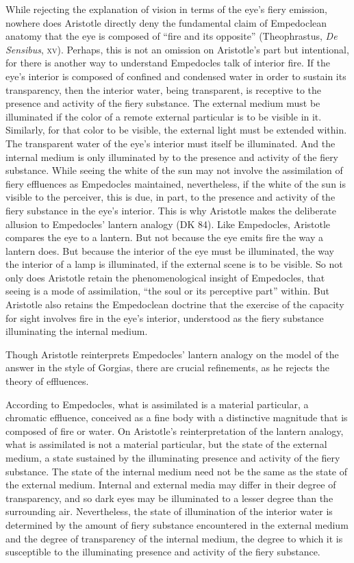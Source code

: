 While rejecting the explanation of vision in terms of the eye's fiery emission, nowhere does Aristotle directly deny the fundamental claim of Empedoclean anatomy that the eye is composed of ``fire and its opposite'' (Theophrastus, \emph{De Sensibus}, \textsc{xv}). Perhaps, this is not an omission on Aristotle's part but intentional, for there is another way to understand Empedocles talk of interior fire. If the eye's interior is composed of confined and condensed water in order to sustain its transparency, then the interior water, being transparent, is receptive to the presence and activity of the fiery substance. The external medium must be illuminated if the color of a remote external particular is to be visible in it. Similarly, for that color to be visible, the external light must be extended within. The transparent water of the eye's interior must itself be illuminated. And the internal medium is only illuminated by to the presence and activity of the fiery substance. While seeing the white of the sun may not involve the assimilation of fiery effluences as Empedocles maintained, nevertheless, if the white of the sun is visible to the perceiver, this is due, in part, to the presence and activity of the fiery substance in the eye's interior. This is why Aristotle makes the deliberate allusion to Empedocles' lantern analogy (DK 84). Like Empedocles, Aristotle compares the eye to a lantern. But not because the eye emits fire the way a lantern does. But because the interior of the eye must be illuminated, the way the interior of a lamp is illuminated, if the external scene is to be visible. So not only does Aristotle retain the phenomenological insight of Empedocles, that seeing is a mode of assimilation, ``the soul or its perceptive part'' within. But Aristotle also retains the Empedoclean doctrine that the exercise of the capacity for sight involves fire in the eye's interior, understood as the fiery substance illuminating the internal medium. 

Though Aristotle reinterprets Empedocles' lantern analogy on the model of the answer in the style of Gorgias, there are crucial refinements, as he rejects the theory of effluences. 

According to Empedocles, what is assimilated is a material particular, a chromatic effluence, conceived as a fine body with a distinctive magnitude that is composed of fire or water. On Aristotle's reinterpretation of the lantern analogy, what is assimilated is not a material particular, but the state of the external medium, a state sustained by the illuminating presence and activity of the fiery substance. The state of the internal medium need not be the same as the state of the external medium. Internal and external media may differ in their degree of transparency, and so dark eyes may be illuminated to a lesser degree than the surrounding air. Nevertheless, the state of illumination of the interior water is determined by the amount of fiery substance encountered in the external medium and the degree of transparency of the internal medium, the degree to which it is susceptible to the illuminating presence and activity of the fiery substance. 

